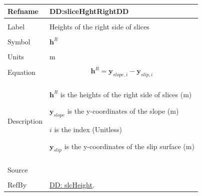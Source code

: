 \documentclass[12pt]{article}
\begin{document}
\noindent \begin{minipage}{\textwidth}
\begin{tabular}{p{} p{}}
\toprule \textbf{Refname} & \textbf{DD:sliceHghtRightDD}
\label{DD:sliceHghtRightDD}
\\ \midrule \\
Label & Heights of the right side of slices
\\ \midrule \\
Symbol & ${\mathbf{h}^{R}}$
\\ \midrule \\
Units & m
\\ \midrule \\
Equation & \begin{displaymath}
           {\mathbf{h}^{R}}={\mathbf{y}_{slope,i}}-{\mathbf{y}_{slip,i}}
           \end{displaymath}
\\ \midrule \\
Description & \begin{symbDescription}
              \item{${\mathbf{h}^{R}}$ is the heights of the right side of slices (m)}
              \item{${\mathbf{y}_{slope}}$ is the y-coordinates of the slope (m)}
              \item{$i$ is the index (Unitless)}
              \item{${\mathbf{y}_{slip}}$ is the y-coordinates of the slip surface (m)}
              \end{symbDescription}
\\ \midrule \\
Source & 
\\ \midrule \\
RefBy & \hyperref[DD:slcHeight]{DD: slcHeight}.
\\ \bottomrule \end{tabular}
\end{minipage}
\par~
\end{document}
